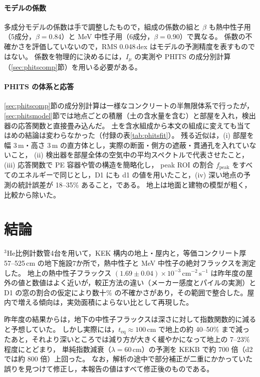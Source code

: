 \documentclass[a4paper,11pt]{ltjsarticle}
\newcommand{\He}{\ensuremath{{}^{3}\mathrm{He}}}
\newcommand{\teq}{t_{\mathrm{eq}}}
\newcommand{\flux}{\mathrm{cm^{-2}\,s^{-1}}}
\begin{document}
\paragraph{モデルの係数}
多成分モデルの係数は手で調整したもので，組成の係数の組と $\beta$ も熱中性子用（5成分，$\beta=0.84$）と MeV 中性子用（6成分，$\beta=0.90$）で異なる。
係数の不確かさを評価していないので，RMS 0.048\,dex はモデルの予測精度を表すものではない。
係数を物理的に決めるには，$I_\mu$ の実測や PHITS の成分別計算（\ref{sec:phitscomp}節）を用いる必要がある。

\paragraph{PHITS の体系と応答}
\ref{sec:phitscomp}節の成分別計算は一様なコンクリートの半無限体系で行ったが，
\ref{sec:phitsmodel}節では地点ごとの積層（土の含水量を含む）と部屋を入れ，検出器の応答関数と直接畳み込んだ。
土を含水組成から本文の組成に変えても当てはめの結論は変わらなかった（付録の表\ref{tab:phitsfit}）。
残る近似は，(i) 部屋を幅 3\,m・高さ 3\,m の直方体とし，実際の断面・側方の遮蔽・貫通孔を入れていないこと，
(ii) 検出器を部屋全体の空気中の平均スペクトルで代表させたこと，(iii) 応答関数で PE 容器や管の構造を簡略化し，
peak ROI の割合 $f_{\mathrm{peak}}$ をすべてのエネルギーで同じとし，D1 にも d1 の値を用いたこと，(iv) 深い地点の予測の統計誤差が 18--35\% あること，である。
地上は地面と建物の模型が粗く，比較から除いた。

\section{結論}

\He 比例計数管4台を用いて，KEK 構内の地上・屋内と，等価コンクリート厚 57--525\,cm の地下施設7か所で，熱中性子と MeV 中性子の絶対フラックスを測定した。
地上の熱中性子フラックス $(1.69\pm0.04)\times10^{-3}\,\flux$ は昨年度の屋外の値と数値はよく近いが，較正方法の違い（メーカー感度とパイルの実測）と D1 の窓の割合の仮定により数十\% の不確かさがあり，その範囲で整合した。屋内で増える傾向は，実効面積によらない比として再現した。

昨年度の結果からは，地下の中性子フラックスは深さに対して指数関数的に減ると予想していた。
しかし実際には，$\teq\approx100$\,cm で地上の約 40--50\% まで減ったあと，それより深いところでは減り方が大きく緩やかになって地上の 7--23\% 程度にとどまり，
単純指数減衰（$\lambda=60$\,cm）の予測を KEKB で約 700 倍（d2 では約 800 倍）上回った。
なお，解析の途中で部分補正が二重にかかっていた誤りを見つけて修正し，本報告の値はすべて修正後のものである。
\end{document}
